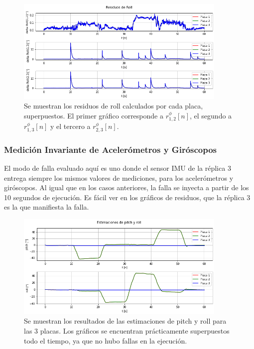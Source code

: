 \begin{figure}[H]
    \centering
    \includegraphics[width=0.9\textwidth]{img/resultados_residuos_roll_saltos_aleatorios.png}
    \caption{Se muestran los residuos de roll calculados por cada placa, superpuestos. El primer gráfico corresponde a $r_{1,2}^{\phi}[n]$, el segundo a $r_{1,3}^{\phi}[n]$ y el tercero a $r_{2,3}^{\phi}[n]$.}
    \label{fig:resultados_residuos_roll_saltos_aleatorios}
\end{figure}


\subsubsection{Medición Invariante de Acelerómetros y Giróscopos}

El modo de falla evaluado aquí es uno donde el sensor IMU de la réplica 3 entrega siempre los mismos valores de mediciones, para los acelerómetros y giróscopos. Al igual que en los casos anteriores, la falla se inyecta a partir de los 10 segundos de ejecución. Es fácil ver en los gráficos de residuos, que la réplica 3 es la que manifiesta la falla.

\begin{figure}[H]
    \centering
    \includegraphics[width=0.9\textwidth]{img/resultados_pitch_roll_enclavado.png}
    \caption{Se muestran los resultados de las estimaciones de pitch y roll para las 3 placas. Los gráficos se encuentran prácticamente superpuestos todo el tiempo, ya que no hubo fallas en la ejecución.}
    \label{fig:resultados_pitch_roll_enclavado}
\end{figure}

